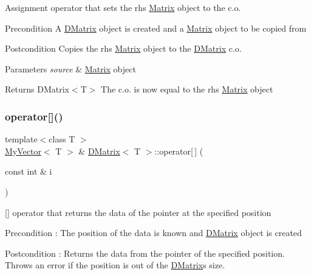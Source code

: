 Assignment operator that sets the rhs \mbox{\hyperlink{class_matrix}{Matrix}} object to the c.\+o. 

\begin{DoxyPrecond}{Precondition}
A \mbox{\hyperlink{class_d_matrix}{D\+Matrix}} object is created and a \mbox{\hyperlink{class_matrix}{Matrix}} object to be copied from 
\end{DoxyPrecond}
\begin{DoxyPostcond}{Postcondition}
Copies the rhs \mbox{\hyperlink{class_matrix}{Matrix}} object to the \mbox{\hyperlink{class_d_matrix}{D\+Matrix}} c.\+o. 
\end{DoxyPostcond}

\begin{DoxyParams}{Parameters}
{\em source} & \mbox{\hyperlink{class_matrix}{Matrix}} object \\
\hline
\end{DoxyParams}
\begin{DoxyReturn}{Returns}
D\+Matrix$<$\+T$>$ The c.\+o. is now equal to the rhs \mbox{\hyperlink{class_matrix}{Matrix}} object 
\end{DoxyReturn}
\mbox{\label{class_d_matrix_a01becea742ca6c07c14c9ca645bd64f0}} 
\subsubsection{\texorpdfstring{operator[]()}{operator[]()}\hspace{0.1cm}{\footnotesize\ttfamily [1/2]}}
{\footnotesize\ttfamily template$<$class T $>$ \\
\mbox{\hyperlink{class_my_vector}{My\+Vector}}$<$ T $>$ \& \mbox{\hyperlink{class_d_matrix}{D\+Matrix}}$<$ T $>$\+::operator\mbox{[}$\,$\mbox{]} (\begin{DoxyParamCaption}\item[{const int \&}]{i }\end{DoxyParamCaption})\hspace{0.3cm}{\ttfamily [virtual]}}



\mbox{[}\mbox{]} operator that returns the data of the pointer at the specified position 

\begin{DoxyPrecond}{Precondition}
\+: The position of the data is known and \mbox{\hyperlink{class_d_matrix}{D\+Matrix}} object is created 
\end{DoxyPrecond}
\begin{DoxyPostcond}{Postcondition}
\+: Returns the data from the pointer of the specified position. Throws an error if the position is out of the \mbox{\hyperlink{class_d_matrix}{D\+Matrix}}\textquotesingle{}s size. 
\end{DoxyPostcond}

